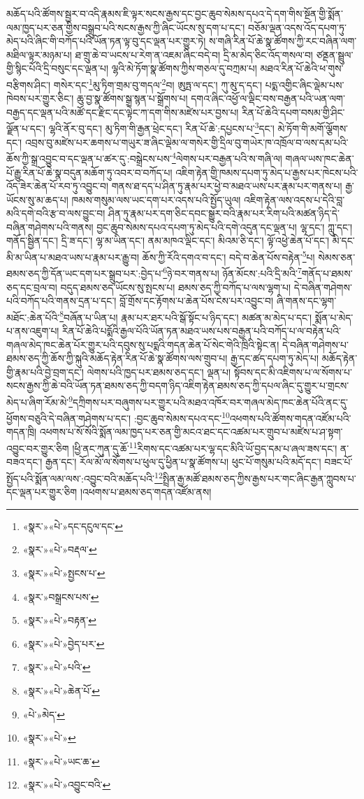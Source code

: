 མཆོད་པའི་ཚོགས་སྦྱར་བ་འདི་རྣམས་ཇི་ལྟར་སངས་རྒྱས་དང་བྱང་ཆུབ་སེམས་དཔའ་དེ་དག་གིས་སྔོན་གྱི་སྨོན་ལམ་ཁྱད་པར་ཅན་གྱིས་བསྒྲུབ་པའི་སངས་རྒྱས་ཀྱི་ཞིང་ཡོངས་སུ་དག་པ་དང་། བཅོམ་ལྡན་འདས་འོད་དཔག་ཏུ་མེད་པའི་ཞིང་གི་བཀོད་པའི་ཡོན་ཏན་ལྟ་བུ་དང་ལྡན་པར་གྱུར་ཏེ། ས་གཞི་རིན་པོ་ཆེ་སྣ་ཚོགས་ཀྱི་རང་བཞིན་ལག་མཐིལ་ལྟར་མཉམ་པ། ཐ་གྲུ་ཆེ་བ་ཡངས་པ་རེག་ན་འཇམ་ཞིང་བདེ་བ། དྲི་མ་མེད་ཅིང་འོད་གསལ་བ། ཙནྡན་སྦྲུལ་གྱི་སྙིང་པོའི་དྲི་བསུང་དང་ལྡན་པ། ལྷའི་མེ་ཏོག་སྣ་ཚོགས་ཀྱིས་གཅལ་དུ་བཀྲམ་པ། མཐའ་རིན་པོ་ཆེའི་ཕ་གུས་བརྩིགས་ཤིང་། གསེར་དང་\footnote{«སྣར་»«པེ་»དང་དངུལ་དང་}མུ་ཏིག་གྲམ་བུ་གདལ་\footnote{«སྣར་»«པེ་»བརྡལ་}བ། ཨུཏྤ་ལ་དང་། ཀུ་མུ་ད་དང་། པདྨ་འགྱིང་ཞིང་ལྡེམ་པས་ཁེབས་པར་གྱུར་ཅིང་། ཆུ་བྱ་སྣ་ཚོགས་སྒྲ་སྙན་པ་སྒྲོགས་པ། དགའ་ཞིང་འཕྱོ་ལ་ལྡིང་བས་བརྒྱན་པའི་ཡན་ལག་བརྒྱད་དང་ལྡན་པའི་མཚོ་དང་རྫིང་དང་ལྟེང་ཀ་དག་གིས་མཛེས་པར་བྱས་པ། རིན་པོ་ཆེའི་དཔག་བསམ་གྱི་ཤིང་ལྗོན་པ་དང་། ལྷའི་ནོར་བུ་དང་། མུ་ཏིག་གི་རྒྱན་ཕྲེང་དང་། རིན་པོ་ཆེ་:དཔྱངས་པ་\footnote{«སྣར་»«པེ་»སྤྱངས་པ་}དང་། མེ་ཏོག་གི་མགོ་ལྕོགས་དང་། འབྲས་བུ་མཛེས་པར་ཆགས་པ་གཡུར་ཟ་ཞིང་ལྡེམ་ལ་གསེར་གྱི་དྲིལ་བུ་གཡེར་ཁ་འཁྲོལ་བ་ལས་དམ་པའི་ཆོས་ཀྱི་སྒྲ་འབྱུང་བ་དང་ལྡན་པ་ཚར་དུ་:བསྒྲེངས་པས་\footnote{«སྣར་»བསྒྲངས་པས་}ལེགས་པར་བརྒྱན་པའི་ས་གཞི་ལ། གཞལ་ཡས་ཁང་ཆེན་པོ་རྒྱུ་རིན་པོ་ཆེ་སྣ་བདུན་མཆོག་ཏུ་འབར་བ་བཀོད་པ། འཇིག་རྟེན་གྱི་ཁམས་དཔག་ཏུ་མེད་པ་རྒྱས་པར་ཁེངས་པའི་འོད་ཟེར་ཆེན་པོ་རབ་ཏུ་འབྱུང་བ། གནས་ཐ་དད་པ་ཤིན་ཏུ་རྣམ་པར་ཕྱེ་བ་མཐའ་ཡས་པར་རྣམ་པར་གནས་པ། རྒྱ་ཡོངས་སུ་མ་ཆད་པ། ཁམས་གསུམ་ལས་ཡང་དག་པར་འདས་པའི་སྤྱོད་ཡུལ། འཇིག་རྟེན་ལས་འདས་པ་དེའི་བླ་མའི་དགེ་བའི་རྩ་བ་ལས་བྱུང་བ། ཤིན་ཏུ་རྣམ་པར་དག་ཅིང་དབང་སྒྱུར་བའི་རྣམ་པར་རིག་པའི་མཚན་ཉིད་དེ་བཞིན་གཤེགས་པའི་གནས། བྱང་ཆུབ་སེམས་དཔའ་དཔག་ཏུ་མེད་པའི་དགེ་འདུན་དང་ལྡན་པ། ལྷ་དང་། ཀླུ་དང་། གནོད་སྦྱིན་དང་། དྲི་ཟ་དང་། ལྷ་མ་ཡིན་དང་། ནམ་མཁའ་ལྡིང་དང་། མིའམ་ཅི་དང་། ལྟོ་འཕྱེ་ཆེན་པོ་དང་། མི་དང་མི་མ་ཡིན་པ་མཐའ་ཡས་པ་རྣམ་པར་རྒྱུ་བ། ཆོས་ཀྱི་རོའི་དགའ་བ་དང་། བདེ་བ་ཆེན་པོས་བརྟེན་\footnote{«སྣར་»«པེ་»བརྟན་}པ། སེམས་ཅན་ཐམས་ཅད་ཀྱི་དོན་ཡང་དག་པར་སྒྲུབ་པར་:བྱེད་པ་\footnote{«སྣར་»«པེ་»བྱེད་པར་}ཉེ་བར་གནས་པ། ཉོན་མོངས་:པའི་དྲི་མའི་\footnote{«སྣར་»«པེ་»པའི་}གནོད་པ་ཐམས་ཅད་དང་བྲལ་བ། བདུད་ཐམས་ཅད་ཡོངས་སུ་སྤངས་པ། ཐམས་ཅད་ཀྱི་བཀོད་པ་ལས་ལྷག་པ། དེ་བཞིན་གཤེགས་པའི་བཀོད་པའི་གནས་དྲན་པ་དང་། བློ་གྲོས་དང་རྟོགས་པ་ཆེན་པོས་ངེས་པར་འབྱུང་བ། ཞི་གནས་དང་ལྷག་མཐོང་:ཆེན་པོའི་\footnote{«སྣར་»«པེ་»ཆེན་པོ་}བཞོན་པ་ཡིན་པ། རྣམ་པར་ཐར་པའི་སྒོ་སྟོང་པ་ཉིད་དང་། མཚན་མ་མེད་པ་དང་། སྨོན་པ་མེད་པ་ནས་འཇུག་པ། རིན་པོ་ཆེའི་པདྨོའི་རྒྱལ་པོའི་ཡོན་ཏན་མཐའ་ཡས་པས་བརྒྱན་པའི་བཀོད་པ་ལ་བརྟེན་པའི་གཞལ་མེད་ཁང་ཆེན་པོར་གྱུར་པའི་དབུས་སུ་པདྨའི་གདན་ཆེན་པོ་སེང་གེའི་ཁྲིའི་སྟེང་ན། དེ་བཞིན་གཤེགས་པ་ཐམས་ཅད་ཀྱི་ཆོས་ཀྱི་སྐུའི་མཆོད་རྟེན་རིན་པོ་ཆེ་སྣ་ཚོགས་ལས་གྲུབ་པ། རྒྱ་དང་ཚད་དཔག་ཏུ་མེད་པ། མཆོད་རྟེན་གྱི་རྣམ་པའི་བྱེ་བྲག་དང་། ལེགས་པའི་ཁྱད་པར་ཐམས་ཅད་དང་། ལྡན་པ། སྟོབས་དང་མི་འཇིགས་པ་ལ་སོགས་པ་སངས་རྒྱས་ཀྱི་ཆེ་བའི་ཡོན་ཏན་ཐམས་ཅད་ཀྱི་བདག་ཉིད་འཇིག་རྟེན་ཐམས་ཅད་ཀྱི་དཔལ་ཞིང་དུ་གྱུར་པ་གྲངས་མེད་པ་ཞིག་རོམ་མེ་\footnote{«པེ་»མེད་}དཀྲིགས་པར་བཞུགས་པར་གྱུར་པའི་མཐའ་འཁོར་བར་གཞལ་མེད་ཁང་ཆེན་པོའི་ནང་དུ་ཕྱོགས་བཅུའི་དེ་བཞིན་གཤེགས་པ་དང་། :བྱང་ཆུབ་སེམས་དཔའ་དང་\footnote{«སྣར་»«པེ་»}འཕགས་པའི་ཚོགས་གདན་འཛོམ་པའི་གདན་ཁྲི། འཕགས་པ་སོ་སོའི་སྨོན་ལམ་ཁྱད་པར་ཅན་གྱི་མངའ་ཐང་དང་འཚམ་པར་གྲུབ་པ་མཛེས་པ་ཤ་སྟག་འབྱུང་བར་གྱུར་ཅིག །ཕྱི་ནང་ཀུན་དུ་ཆོ་\footnote{«སྣར་»«པེ་»ཡང་ཆ་}རིགས་དང་འཚམ་པར་ལྷ་དང་མིའི་ཡོ་བྱད་དམ་པ་ཞལ་ཟས་དང་། ན་བཟའ་དང་། རྒྱན་དང་། རོལ་མོ་ལ་སོགས་པ་ཕུལ་དུ་ཕྱིན་པ་སྣ་ཚོགས་པ། ཕུང་པོ་གསུམ་པའི་མདོ་དང་། བཟང་པོ་སྤྱོད་པའི་སྨོན་ལམ་ལས་:འབྱུང་བའི་མཆོད་པའི་\footnote{«སྣར་»«པེ་»འབྱུང་བའི་}སྤྲིན་རྒྱ་མཚོ་ཐམས་ཅད་ཀྱིས་རྒྱས་པར་གང་ཞིང་རྒྱན་ཀླུབས་པ་དང་ལྡན་པར་གྱུར་ཅིག །འཕགས་པ་ཐམས་ཅད་གདན་འཛོམ་ནས། 